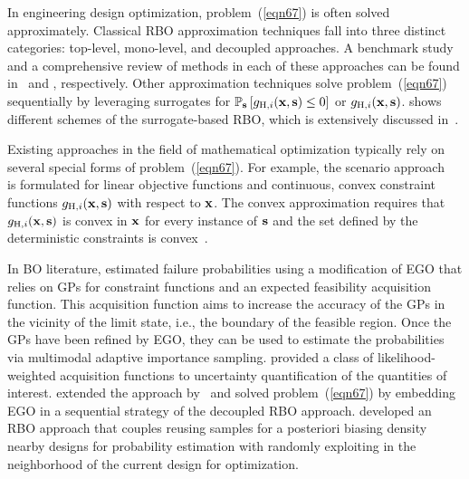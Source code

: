\documentclass[journal ]{new-aiaa}
\begin{document}
In engineering design optimization, problem~(\ref{eqn67}) is often solved approximately.
Classical RBO approximation techniques fall into three distinct categories: top-level, mono-level, and decoupled approaches.
A benchmark study and a comprehensive review of methods in each of these approaches can be found in~\citet{Aoues2010} and \citet{Valdebenito2010}, respectively.
Other approximation techniques solve problem~(\ref{eqn67}) sequentially by leveraging surrogates for $\mathbb{P}_{\bf s}\left[g_{\text{H},i}({\bf x},{\bf s}) \leq 0\right]$ or $g_{\text{H},i}({\bf x},{\bf s})$.
 shows different schemes of the surrogate-based RBO, which is extensively discussed in~\citet{Moustapha2019}.  

Existing approaches in the field of mathematical optimization typically rely on several special forms of problem~(\ref{eqn67}).
For example, the scenario approach~\citep{Calafiore2006} is formulated for linear objective functions and continuous, convex constraint functions $g_{\text{H},i}({\bf x},{\bf s})$ with respect to ${\bf x}$.
The convex approximation requires that $g_{\text{H},i}({\bf x},{\bf s})$ is convex in ${\bf x}$ for every instance
of ${\bf s}$ and the set defined by the deterministic constraints is convex~\citep{Nemirovski2012}.

In BO literature, \citet{Bichon2008} estimated failure probabilities using a modification of EGO that relies on GPs for constraint functions and an expected feasibility acquisition function.
This acquisition function aims to increase the accuracy of the GPs in the vicinity of the limit state, i.e., the boundary of the feasible region. 
Once the GPs have been refined by EGO, they can be used to estimate the probabilities via multimodal adaptive importance sampling.
\citet{Blanchard2021siamjuq} provided a class of likelihood-weighted acquisition functions to uncertainty quantification of the quantities of interest.
\citet{Huynh2023} extended the approach by~\citet{Bichon2008} and solved problem~(\ref{eqn67}) by embedding EGO in a sequential strategy of the decoupled RBO approach.
\citet{Chaudhuri2020} developed an RBO approach that couples reusing samples for a posteriori biasing density nearby designs for probability estimation with randomly exploiting in the neighborhood of the current design for optimization.
\end{document}
